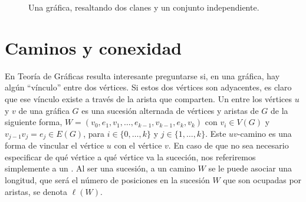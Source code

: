 \begin{figure}[ht!]
    \centering
    \caption{Una gr\'afica, resaltando dos clanes y un conjunto independiente.}
    \label{fig:ClanInd}
\end{figure}


\section{Caminos y conexidad}
\label{sec:CamConex}


En Teor\'ia de Gr\'aficas resulta interesante preguntarse si, en una
gr\'afica, hay alg\'un ``v\'inculo'' entre dos v\'ertices. Si estos dos
v\'ertices son adyacentes, es claro que ese v\'inculo existe a trav\'es de
la arista que comparten. Un  entre los v\'ertices $u$ y
$v$ de una gr\'afica $G$ es una sucesi\'on alternada de v\'ertices y aristas
de $G$ de la siguiente forma, $W=(v_0, e_1,v_1, \dots, e_{k-1},v_{k-1},
e_k,v_k)$ con $v_i \in V(G)$ y $v_{j-1}v_j = e_j \in E(G)$, para $i \in \{0,
\dots, k\}$ y $j \in \{ 1, \dots, k\}$. Este $uv$-camino es una forma de
vincular el v\'ertice $u$ con el v\'ertice $v$. En caso de que no sea
necesario especificar de qu\'e v\'ertice a qu\'e v\'ertice va la suceci\'on,
nos referiremos simplemente a un . Al ser una sucesi\'on, a
un camino $W$ se le puede asociar una longitud, que ser\'a el n\'umero de
posiciones en la sucesi\'on $W$ que son ocupadas por aristas, se denota
$\ell(W)$. 

